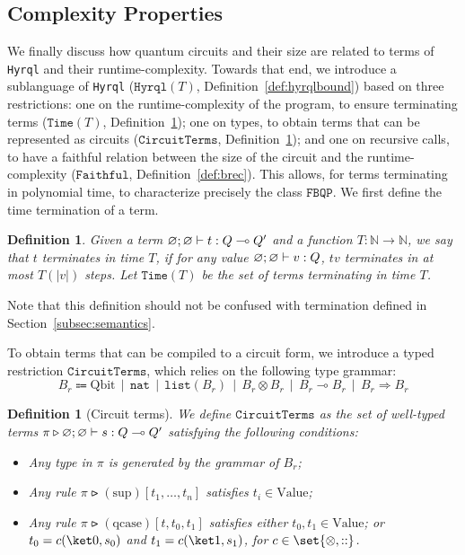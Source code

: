 \documentclass[10pt,a4paper]{article}
\newcommand{\qbit}{\mathrm{Qbit}}
\newcommand{\nonlinfunc}{\Rightarrow}
\newcommand{\linfunc}{\multimap}
\newcommand{\nat}{\mathtt{nat}}
\newcommand{\typelist}[1]{\mathtt{list}(#1)}
\newcommand{\valueset}{\mathrm{Value}}
\newcommand{\typing}[4]{
  \ifx&#1&\varnothing \else #1\fi; 
  \ifx&#2&\varnothing \else #2\fi 
  \vdash {#3} : #4
}
\newcommand{\closedtyping}[2]{\typing{}{}{#1}{#2}}
\newcommand{\circuittype}{\ensuremath{\mathtt{CircuitTerms}}}
\newcommand{\hyrqlbound}[1]{\ensuremath{\mathtt{Hyrql}({#1})}}
\newcommand{\boundedrec}{\ensuremath{\mathtt{Faithful}}}
\newcommand{\timeset}[1]{\mathtt{Time}(#1)}
\newcommand{\gmid}{\,\mid\,}
\newcommand{\size}[1]{|#1|}
\newcommand{\hyrql}{{{\tt{Hyrql}}}}
\newcommand{\fbqp}{\ensuremath{\mathtt{FBQP}}}
\newcommand{\mbN}{\mathbb N}
\newtheorem{definition}[theorem]{Definition}
\begin{document}
\subsection{Complexity Properties}\label{subsec:poly}

We finally discuss how quantum circuits and their size are related to terms of
\hyrql{} and their runtime-complexity. Towards that end, we introduce a
sublanguage of \hyrql{} ($\hyrqlbound T$, Definition~\ref{def:hyrqlbound})
based on three restrictions:
one on the runtime-complexity of the program, to ensure terminating terms
($\timeset T$, Definition~\ref{def:time});
one on types, to obtain terms that can be represented as circuits
($\circuittype$, Definition~\ref{def:restrict-circuit});
and one on recursive calls, to have a faithful relation between the size of the
circuit and the runtime-complexity ($\boundedrec$, Definition~\ref{def:brec}).
This allows, for terms terminating in polynomial time, to characterize
precisely the class \fbqp{}. We first define the time termination of a term.

\begin{definition}\label{def:time}
  Given a term $\closedtyping t Q \linfunc Q'$ and a function $T : \mbN \to \mbN$,
  we say that $t$ \emph{terminates in time $T$}, if for any value 
  $\closedtyping v Q$, $tv$ terminates in at most $T(\size v)$ steps.
  Let $\timeset T$ be the set of terms terminating in time $T$.
\end{definition}

Note that this definition should not be confused with termination defined in
Section~\ref{subsec:semantics}.

To obtain terms that can be compiled to a circuit form, we introduce a 
typed restriction \circuittype{}, which relies on the following type grammar:
\[
    B_r \Coloneqq \qbit \gmid \nat \gmid \typelist{B_r} \gmid B_r \otimes
    B_r \gmid B_r \linfunc B_r \gmid B_r \nonlinfunc B_r
\]

\begin{definition}[Circuit terms]\label{def:restrict-circuit}
  We define $\circuittype$ as the set of well-typed terms $\pi \triangleright
  \closedtyping s Q \linfunc Q'$ satisfying the following conditions:
  \begin{itemize}
    \item Any type in $\pi$ is generated by the grammar of $B_r$;
    \item Any rule $\pi \rightslice (\mathrm{sup})[t_1, \dots, t_n]$
      satisfies $t_i \in \valueset$;
    \item Any rule $\pi \rightslice (\mathrm{qcase})[t, t_0, t_1]$ satisfies
      either $t_0, t_1 \in \valueset$; or $t_0 = c(\ket 0, s_0)$ and
      $t_1 = c(\ket 1, s_1)$, for $c \in \set{\otimes, ::}$.
  \end{itemize}
\end{definition}
\end{document}
